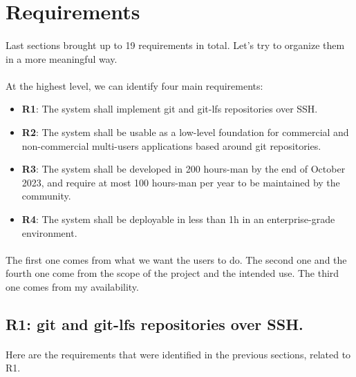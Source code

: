 \newpage
\section{Requirements}

\paragraph{}
Last sections brought up to 19 requirements in total. Let's try to organize them in a more meaningful way.

\paragraph{}
At the highest level, we can identify four main requirements:

\begin{itemize}
    \item \textbf{R1}: The system shall implement git and git-lfs repositories over SSH.
    \item \textbf{R2}: The system shall be usable as a low-level foundation for commercial and non-commercial multi-users applications based around git repositories.
    \item \textbf{R3}: The system shall be developed in 200 hours-man by the end of October 2023, and require at most 100 hours-man per year to be maintained by the community. 
    \item \textbf{R4}: The system shall be deployable in less than 1h in an enterprise-grade environment.
\end{itemize}

\paragraph{}
The first one comes from what we want the users to do. The second one and the fourth one come from the scope of the project and the intended use. The third one comes from my availability.

\subsection{R1: git and git-lfs repositories over SSH.}

\paragraph{}
Here are the requirements that were identified in the previous sections, related to R1.


